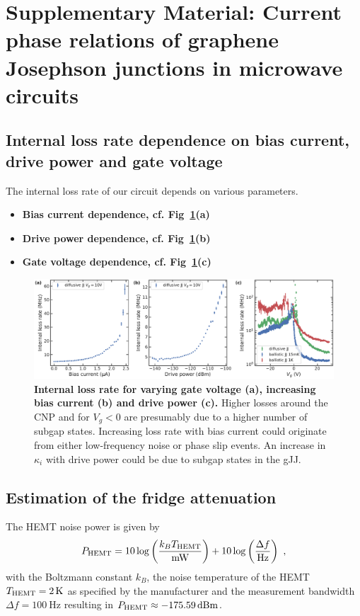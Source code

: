 \section{Supplementary Material: Current phase relations of graphene Josephson junctions in microwave circuits}

\subsection{Internal loss rate dependence on bias current, drive power and gate voltage}\label{sec:kintib}

The internal loss rate of our circuit depends on various parameters.

\begin{itemize}
	\item \textbf{Bias current dependence, cf. Fig~\ref{fig:SMFig-lossrates}(a)}
	\item \textbf{Drive power dependence, cf. Fig~\ref{fig:SMFig-lossrates}(b)}
	\item \textbf{Gate voltage dependence, cf. Fig~\ref{fig:SMFig-lossrates}(c)}
\end{itemize}

\begin{figure}
	\centering
	\includegraphics[width=\linewidth]{chapter-gJJ-CPR/figs/SMFigure-lossrates}
	\caption{
		\textbf{Internal loss rate for varying gate voltage (a), increasing bias current (b) and drive power (c).}
		Higher losses around the CNP and for $V_g<0$ are presumably due to a higher number of subgap states.
		Increasing loss rate with bias current could originate from either low-frequency noise or phase slip events.
		An increase in $\kappa_i$ with drive power could be due to subgap states in the gJJ.
	}
	\label{fig:SMFig-lossrates}
\end{figure}


\subsection{Estimation of the fridge attenuation}\label{sec:attenuation}
The HEMT noise power is given by
%
\begin{align}
P_{\rm HEMT}=10\log\left(\frac{k_B T_{\rm HEMT}}{\si{\milli\watt}}\right) + 10\log\left(\frac{\Delta f}{\si{\hertz}}\right)\ ,
\label{eq:HEMT}
\end{align}
%
with the Boltzmann constant $k_B$, the noise temperature of the HEMT $T_{\rm HEMT}=\SI{2}{\kelvin}$ as specified by the manufacturer and the measurement bandwidth $\Delta f=\SI{100}{\hertz}$ resulting in $P_{\rm HEMT}\approx\SI{-175.59}{dBm}$.

